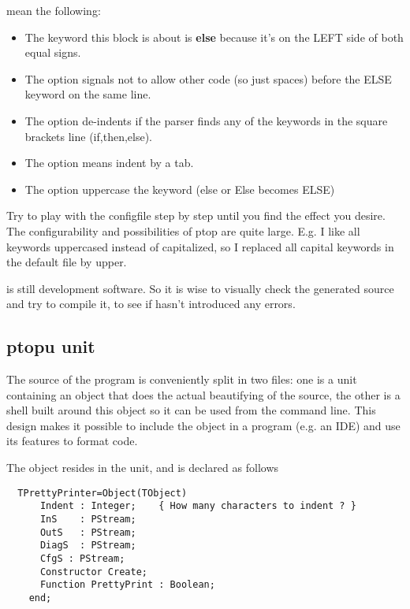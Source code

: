 mean the following:

\begin{itemize}
\item The keyword this block is about is \textbf{else} because it's on the LEFT side
of both equal signs.
\item The option  signals not to allow other code (so just spaces)
before the ELSE keyword on the same line.
\item The option  de-indents if the parser finds any of the keywords
 in the square brackets line (if,then,else).
\item The option  means indent by a tab.
\item The option  uppercase the keyword (else or Else becomes ELSE)
\end{itemize}

Try to play with the configfile step by step until you find the effect you desire.
The configurability and possibilities of ptop are quite large. E.g. I like all
keywords uppercased instead of capitalized, so I replaced all capital keywords in
the default file by upper.

 is still development software. So it is wise to visually check the generated
source and try to compile it, to see if  hasn't introduced any errors.

\subsection{ptopu unit}

The source of the  program is conveniently split in two files:
one is a unit containing an object that does the actual beautifying of the
source, the other is a shell built around this object so it can be used
from the command line. This design makes it possible to include the object
in a program (e.g. an IDE) and use its features to format code.

The object resides in the  unit, and is declared as follows
\begin{verbatim}
  TPrettyPrinter=Object(TObject)
      Indent : Integer;    { How many characters to indent ? }
      InS    : PStream;
      OutS   : PStream;
      DiagS  : PStream;
      CfgS : PStream;
      Constructor Create;
      Function PrettyPrint : Boolean;
    end;
\end{verbatim}

